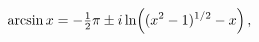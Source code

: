 \[\mathop{\mathrm{arcsin}\/}\nolimits x=-\tfrac{1}{2}\pi\pm i\mathop{\ln\/}%
\nolimits\!\left((x^{2}-1)^{1/2}-x\right),\]